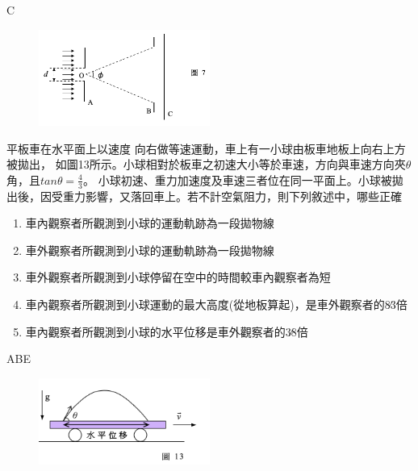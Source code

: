 \documentclass[cn,10pt,math=newtx,chinesefont=founder]{elegantbook}
\begin{document}
\begin{solution}
    C
\end{solution}
\begin{figure}[htbp]
    \flushright
    \includegraphics[width=0.5\textwidth]{image/94_7.png}
\end{figure}
\newpage

\begin{example}
    平板車在水平面上以速度 向右做等速運動，車上有一小球由板車地板上向右上方被拋出，
    如圖13所示。小球相對於板車之初速大小等於車速，方向與車速方向夾$\theta$角，且$tan\theta = \frac{4}{3}$。
    小球初速、重力加速度及車速三者位在同一平面上。小球被拋出後，因受重力影響，又落回車上。若不計空氣阻力，則下列敘述中，哪些正確
    \begin{enumerate}[label=(\Alph*)]
        \item 車內觀察者所觀測到小球的運動軌跡為一段拋物線
        \item 車外觀察者所觀測到小球的運動軌跡為一段拋物線
        \item 車外觀察者所觀測到小球停留在空中的時間較車內觀察者為短
        \item 車內觀察者所觀測到小球運動的最大高度(從地板算起)，是車外觀察者的8∕3倍
        \item 車內觀察者所觀測到小球的水平位移是車外觀察者的3∕8倍
    \end{enumerate}
    \rightline{[94指考]}
\end{example}
\begin{solution}
    ABE
\end{solution}
\begin{figure}[htbp]
    \flushright
    \includegraphics[width=0.5\textwidth]{image/94_14.png}
\end{figure}
\newpage
\end{document}
